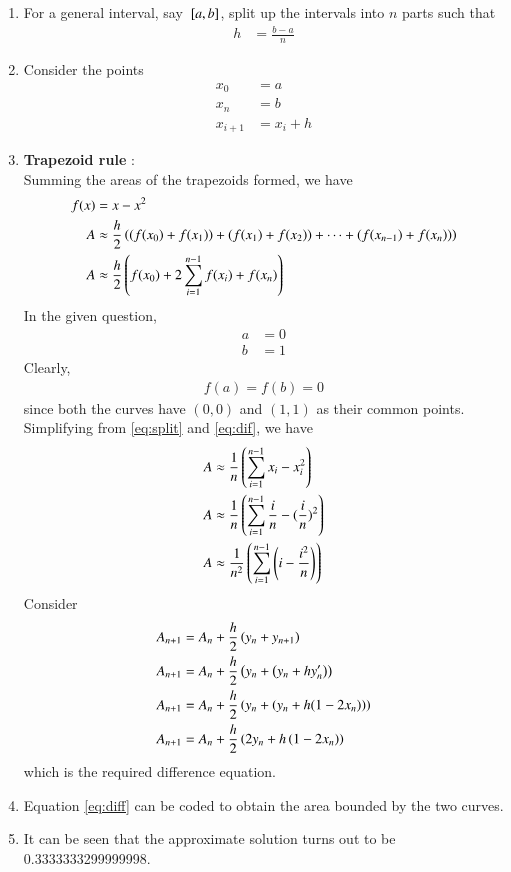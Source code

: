 \documentclass[journal]{IEEEtran}
\begin{document}
\begin{enumerate}
\item For a general interval, say ${}\left[a,b\right]$, split up the intervals into $n$ parts such that
\begin{align}
	h &= \frac{b-a}{n} \label{eq:split}
\end{align}
\item Consider the points 
\begin{align}
	x_{0} &= a \\
	x_{n} &= b \\
	x_{i+1} &= x_{i} + h
\end{align}
\item \textbf{Trapezoid rule} : \\
Summing the areas of the trapezoids formed, we have
\begin{align}
	f(x) &= x - x^2 \\
	A &\approx \frac{h}{2} \left((f(x_{0}) + f(x_{1})) + (f(x_{1}) + f(x_{2})) + \dots + (f(x_{n-1}) + f(x_{n}))\right) \\
	A &\approx \frac{h}{2} \left(f(x_{0}) + 2 \sum_{i=1}^{n-1} f(x_{i}) + f(x_{n}) \right) \label{eq:dif}
\end{align}
In the given question, 
\begin{align}
	a &= 0 \\
	b &= 1
\end{align}
Clearly, 
\begin{align}
	f(a) = f(b) = 0
\end{align}
since both the curves have $(0,0)$ and $(1,1)$ as their common points. Simplifying from \eqref{eq:split} and \eqref{eq:dif}, we have
\begin{align}
	A &\approx \frac{1}{n} \left(\sum_{i=1}^{n-1} x_{i} - x_{i}^2 \right) \\
	A &\approx \frac{1}{n} \left(\sum_{i=1}^{n-1} \frac{i}{n}  - (\frac{i}{n} )^2 \right) \\
	A &\approx \frac{1}{n^2} \left( \sum_{i=1}^{n-1} \left(i - \frac{i^2}{n} \right) \right) \label{eq:diff}
\end{align}
Consider
\begin{align}
A_{n+1} &= A_{n} + \frac{h}{2} \left(y_{n} + y_{n+1}\right) \\
A_{n+1} &= A_{n} + \frac{h}{2} \left(y_{n} + \left(y_{n} + h y^{\prime}_{n}\right)\right) \\
A_{n+1} &= A_{n} + \frac{h}{2} \left(y_{n} + \left(y_{n} + h (1 - 2x_{n} )\right) \right) \\
A_{n+1} &= A_{n} + \frac{h}{2} \left(2 y_{n} + h \left(1 - 2 x_{n}\right)\right)
\end{align}
which is the required difference equation.
\item Equation \eqref{eq:diff} can be coded to obtain the area bounded by the two curves.
\item It can be seen that the approximate solution turns out to be 0.3333333299999998.
\end{enumerate}
\end{document}
